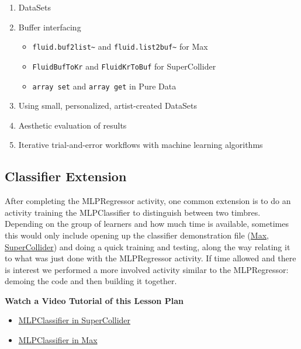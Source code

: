 \documentclass{article}
\providecommand{\tightlist}{%
  \setlength{\itemsep}{0pt}\setlength{\parskip}{0pt}}
\begin{document}
\begin{enumerate}
\def\labelenumi{\arabic{enumi}.}
\tightlist
\item
  DataSets
\item
  Buffer interfacing

  \begin{itemize}
  \tightlist
  \item
    \texttt{fluid.buf2list\textasciitilde{}} and
    \texttt{fluid.list2buf\textasciitilde{}} for Max
  \item
    \texttt{FluidBufToKr} and \texttt{FluidKrToBuf} for SuperCollider
  \item
    \texttt{array\ set} and \texttt{array\ get} in Pure Data
  \end{itemize}
\item
  Using small, personalized, artist-created DataSets
\item
  Aesthetic evaluation of results
\item
  Iterative trial-and-error workflows with machine learning algorithms
\end{enumerate}

\subsection{Classifier Extension}\label{classifier-extension}

After completing the MLPRegressor activity, one common extension is to
do an activity training the MLPClassifier to distinguish between two timbres. Depending on the group of
learners and how much time is available, sometimes this would only
include opening up the classifier demonstration file
(\href{https://learn.flucoma.org/examples/classification-video-demo.maxpat}{Max},
\href{https://learn.flucoma.org/examples/classification-video-demo.scd}{SuperCollider})
and doing a quick training and testing, along the way relating it to
what was just done with the MLPRegressor activity. If time allowed and
there is interest we performed a more involved activity similar to the
MLPRegressor: demoing the code and then building it together.

\textbf{Watch a Video Tutorial of this Lesson Plan}

\begin{itemize}
\tightlist
\item
  \href{https://www.youtube.com/watch?v=Y1cHmtbQPSk}{MLPClassifier in
  SuperCollider}
\item
  \href{https://www.youtube.com/watch?v=cjk9oHw7PQg}{MLPClassifier in
  Max}
\end{itemize}
\end{document}
